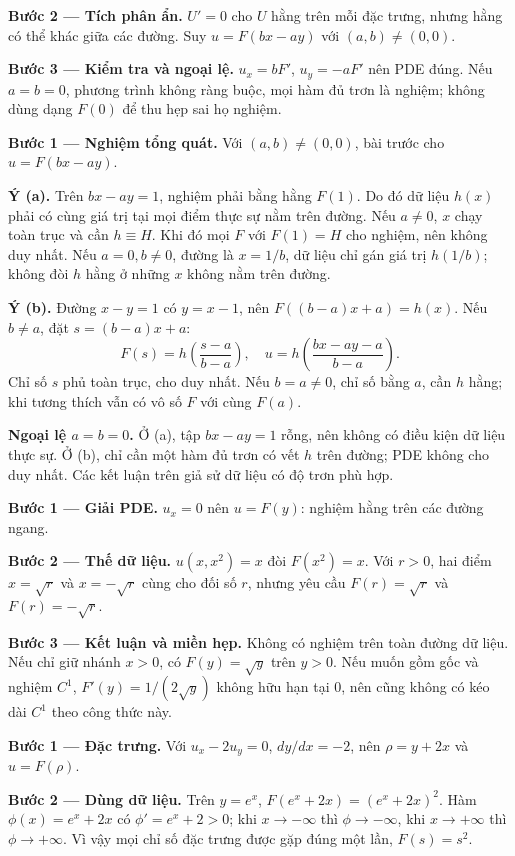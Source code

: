 \textbf{Bước 2 — Tích phân ẩn.} $U'=0$ cho $U$ hằng trên mỗi đặc trưng, nhưng hằng có thể khác giữa các đường. Suy $u=F(bx-ay)$ với $(a,b)\ne(0,0)$.

\textbf{Bước 3 — Kiểm tra và ngoại lệ.} $u_x=bF'$, $u_y=-aF'$ nên PDE đúng. Nếu $a=b=0$, phương trình không ràng buộc, mọi hàm đủ trơn là nghiệm; không dùng dạng $F(0)$ để thu hẹp sai họ nghiệm.

\textbf{Bước 1 — Nghiệm tổng quát.} Với $(a,b)\ne(0,0)$, bài trước cho $u=F(bx-ay)$.

\textbf{Ý (a).} Trên $bx-ay=1$, nghiệm phải bằng hằng $F(1)$. Do đó dữ liệu $h(x)$ phải có cùng giá trị tại mọi điểm thực sự nằm trên đường. Nếu $a\ne0$, $x$ chạy toàn trục và cần $h\equiv H$. Khi đó mọi $F$ với $F(1)=H$ cho nghiệm, nên không duy nhất. Nếu $a=0,b\ne0$, đường là $x=1/b$, dữ liệu chỉ gán giá trị $h(1/b)$; không đòi $h$ hằng ở những $x$ không nằm trên đường.

\textbf{Ý (b).} Đường $x-y=1$ có $y=x-1$, nên $F((b-a)x+a)=h(x)$. Nếu $b\ne a$, đặt $s=(b-a)x+a$:
\[F(s)=h\left(\frac{s-a}{b-a}\right),\quad u=h\left(\frac{bx-ay-a}{b-a}\right).\]
Chỉ số $s$ phủ toàn trục, cho duy nhất. Nếu $b=a\ne0$, chỉ số bằng $a$, cần $h$ hằng; khi tương thích vẫn có vô số $F$ với cùng $F(a)$.

\textbf{Ngoại lệ $a=b=0$.} Ở (a), tập $bx-ay=1$ rỗng, nên không có điều kiện dữ liệu thực sự. Ở (b), chỉ cần một hàm đủ trơn có vết $h$ trên đường; PDE không cho duy nhất. Các kết luận trên giả sử dữ liệu có độ trơn phù hợp.

\textbf{Bước 1 — Giải PDE.} $u_x=0$ nên $u=F(y)$: nghiệm hằng trên các đường ngang.

\textbf{Bước 2 — Thế dữ liệu.} $u(x,x^2)=x$ đòi $F(x^2)=x$. Với $r>0$, hai điểm $x=\sqrt r$ và $x=-\sqrt r$ cùng cho đối số $r$, nhưng yêu cầu $F(r)=\sqrt r$ và $F(r)=-\sqrt r$.

\textbf{Bước 3 — Kết luận và miền hẹp.} Không có nghiệm trên toàn đường dữ liệu. Nếu chỉ giữ nhánh $x>0$, có $F(y)=\sqrt y$ trên $y>0$. Nếu muốn gồm gốc và nghiệm $C^1$, $F'(y)=1/(2\sqrt y)$ không hữu hạn tại 0, nên cũng không có kéo dài $C^1$ theo công thức này.

\textbf{Bước 1 — Đặc trưng.} Với $u_x-2u_y=0$, $dy/dx=-2$, nên $\rho=y+2x$ và $u=F(\rho)$.

\textbf{Bước 2 — Dùng dữ liệu.} Trên $y=e^x$, $F(e^x+2x)=(e^x+2x)^2$. Hàm $\phi(x)=e^x+2x$ có $\phi'=e^x+2>0$; khi $x\to-\infty$ thì $\phi\to-\infty$, khi $x\to+\infty$ thì $\phi\to+\infty$. Vì vậy mọi chỉ số đặc trưng được gặp đúng một lần, $F(s)=s^2$.


